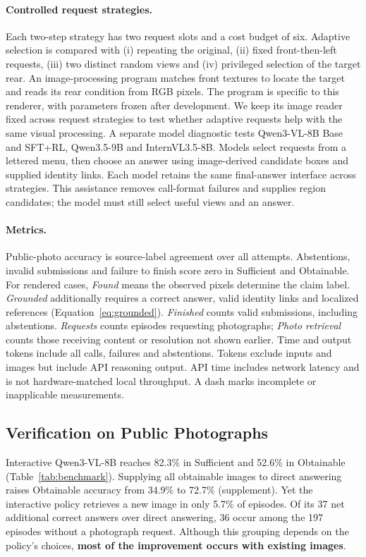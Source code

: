\documentclass[10pt,twocolumn,letterpaper]{article}
\begin{document}
\paragraph{Controlled request strategies.}
Each two-step strategy has two request slots and a cost budget of six.
Adaptive selection is compared with (i) repeating the original, (ii) fixed front-then-left requests, (iii) two distinct random views and (iv) privileged selection of the target rear.
An image-processing program matches front textures to locate the target and reads its rear condition from RGB pixels.
The program is specific to this renderer, with parameters frozen after development.
We keep its image reader fixed across request strategies to test whether adaptive requests help with the same visual processing.
A separate model diagnostic tests Qwen3-VL-8B Base and SFT+RL, Qwen3.5-9B and InternVL3.5-8B.
Models select requests from a lettered menu, then choose an answer using image-derived candidate boxes and supplied identity links.
Each model retains the same final-answer interface across strategies.
This assistance removes call-format failures and supplies region candidates; the model must still select useful views and an answer.

\paragraph{Metrics.}
Public-photo accuracy is source-label agreement over all attempts.
Abstentions, invalid submissions and failure to finish score zero in Sufficient and Obtainable.
For rendered cases, \emph{Found} means the observed pixels determine the claim label.
\emph{Grounded} additionally requires a correct answer, valid identity links and localized references (Equation~\ref{eq:grounded}).
\emph{Finished} counts valid submissions, including abstentions.
\emph{Requests} counts episodes requesting photographs; \emph{Photo retrieval} counts those receiving content or resolution not shown earlier.
Time and output tokens include all calls, failures and abstentions.
Tokens exclude inputs and images but include API reasoning output.
API time includes network latency and is not hardware-matched local throughput.
A dash marks incomplete or inapplicable measurements.

\subsection{Verification on Public Photographs}

Interactive Qwen3-VL-8B reaches 82.3\% in Sufficient and 52.6\% in Obtainable (Table~\ref{tab:benchmark}).
Supplying all obtainable images to direct answering raises Obtainable accuracy from 34.9\% to 72.7\% (supplement).
Yet the interactive policy retrieves a new image in only 5.7\% of episodes.
Of its 37 net additional correct answers over direct answering, 36 occur among the 197 episodes without a photograph request.
Although this grouping depends on the policy's choices, \textbf{most of the improvement occurs with existing images}.
\end{document}
